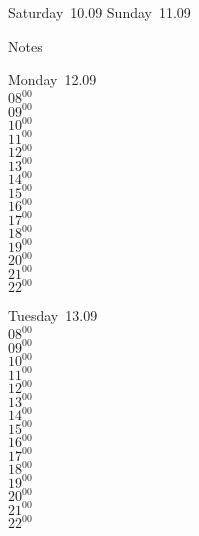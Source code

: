 \documentclass[11pt,a4paper]{book}\usepackage[]{graphicx}\usepackage[]{color}
\begin{document}
\begin{weekendbox}
  Saturday~10.09
  \tcblower
  Sunday~11.09
\end{weekendbox} %
\begin{notebox}
  Notes
\end{notebox}
\clearpage
\begin{headerbox}
\end{headerbox}
\begin{weekdaybox}
  Monday~12.09\\
  { 
  \vfill
  $08^{00}$\\
$09^{00}$\\
$10^{00}$\\
$11^{00}$\\
$12^{00}$\\
$13^{00}$\\
$14^{00}$\\
$15^{00}$\\
$16^{00}$\\
$17^{00}$\\
$18^{00}$\\
$19^{00}$\\
$20^{00}$\\
$21^{00}$\\
$22^{00}$\\
  }
\end{weekdaybox}
\begin{weekdaybox}
  Tuesday~13.09\\
  { 
  \vfill
  $08^{00}$\\
$09^{00}$\\
$10^{00}$\\
$11^{00}$\\
$12^{00}$\\
$13^{00}$\\
$14^{00}$\\
$15^{00}$\\
$16^{00}$\\
$17^{00}$\\
$18^{00}$\\
$19^{00}$\\
$20^{00}$\\
$21^{00}$\\
$22^{00}$\\
  }
\end{weekdaybox}
\end{document}
